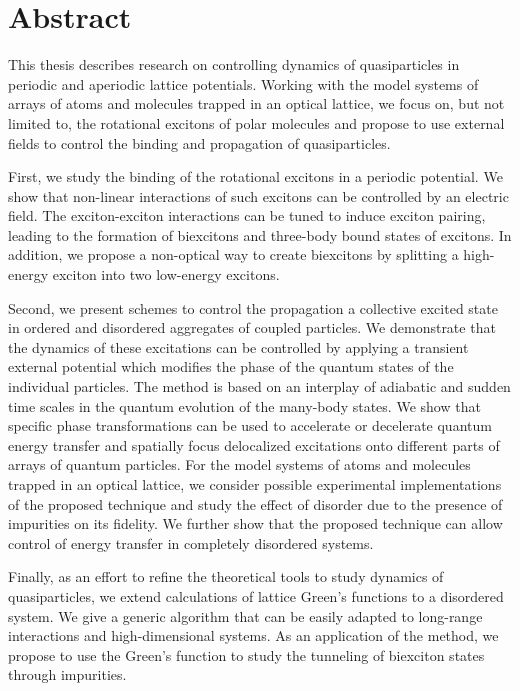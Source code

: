 
\chapter{Abstract}

This thesis describes research on controlling dynamics of quasiparticles in 
 periodic and aperiodic lattice potentials. Working with the model systems of arrays of atoms and molecules trapped in an optical lattice, 
we focus on, but not limited to, the rotational excitons of polar molecules and propose to use external fields to 
control the binding and propagation of quasiparticles. 

First, we study the binding of the rotational excitons in a periodic potential. We show that non-linear interactions of such excitons can
 be controlled by an electric field. The exciton-exciton interactions can be tuned
 to induce exciton pairing, leading to the formation of biexcitons and three-body bound states of excitons. In addition, we propose a non-optical way to create biexcitons by splitting a high-energy exciton into two 
low-energy excitons. 

Second, we present schemes to control the propagation a collective
 excited state in ordered and disordered aggregates of coupled particles. We demonstrate that the dynamics of these excitations can be controlled by
 applying a transient external potential which modifies the phase of the quantum
 states of the individual particles. The method is based on an interplay of adiabatic
 and sudden time scales in the quantum evolution of the many-body states. We show
 that specific phase transformations can be used to accelerate or decelerate quantum
 energy transfer and spatially focus delocalized excitations onto different parts of
arrays of quantum particles. For the model systems of atoms and molecules trapped in an optical lattice, we consider possible experimental implementations
 of the proposed technique and study the effect of disorder due to the presence of
 impurities on its fidelity. We further show that the proposed technique can allow
 control of energy transfer in completely disordered systems.
 

Finally, as an effort to refine the theoretical tools to study dynamics of quasiparticles, we extend calculations of lattice 
Green's functions to a disordered system. We give a generic algorithm that can 
be easily adapted to long-range interactions and high-dimensional systems. As an application of the method, we propose 
to use the Green’s function to study the tunneling of biexciton states through
 impurities.


